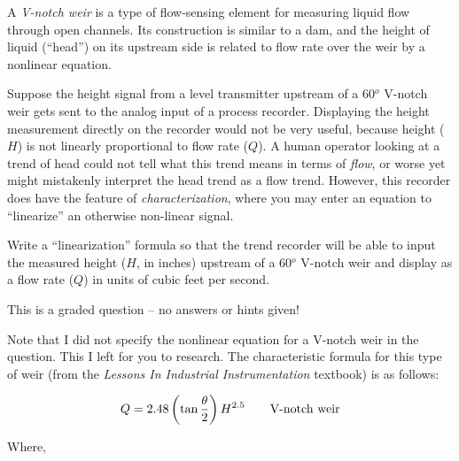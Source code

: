 

A {\it V-notch weir} is a type of flow-sensing element for measuring liquid flow through open channels.  Its construction is similar to a dam, and the height of liquid (``head'') on its upstream side is related to flow rate over the weir by a nonlinear equation.

Suppose the height signal from a level transmitter upstream of a 60$^{o}$ V-notch weir gets sent to the analog input of a process recorder.  Displaying the height measurement directly on the recorder would not be very useful, because height ($H$) is not linearly proportional to flow rate ($Q$).  A human operator looking at a trend of head could not tell what this trend means in terms of {\it flow}, or worse yet might mistakenly interpret the head trend as a flow trend.  However, this recorder does have the feature of {\it characterization}, where you may enter an equation to ``linearize'' an otherwise non-linear signal.

\vskip 10pt

Write a ``linearization'' formula so that the trend recorder will be able to input the measured height ($H$, in inches) upstream of a 60$^{o}$ V-notch weir and display as a flow rate ($Q$) in units of cubic feet per second.

\vfil 

\eject






This is a graded question -- no answers or hints given!







Note that I did not specify the nonlinear equation for a V-notch weir in the question.  This I left for you to research.  The characteristic formula for this type of weir (from the {\it Lessons In Industrial Instrumentation} textbook) is as follows:

$$Q = 2.48 \left( \tan {\theta \over 2} \right) H^{2.5} \hbox{\hskip 20pt V-notch weir}$$

\noindent
Where,

